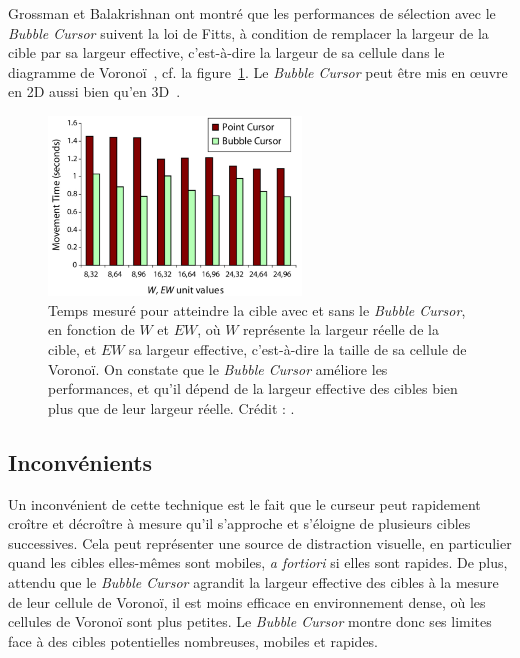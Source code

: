 	Grossman et Balakrishnan ont montré que les performances de sélection avec le \emph{Bubble Cursor} suivent la loi de Fitts, à condition de remplacer la largeur de la cible par sa largeur effective, c'est-à-dire la largeur de sa cellule dans le diagramme de Voronoï~\cite{grossman2005bubble}, cf. la figure~\ref{fig:bubbleResults}. Le \emph{Bubble Cursor} peut être mis en œuvre en 2D aussi bien qu'en 3D~\cite{vanacken2007exploring}.

	\begin{figure}[!htb]
		\centering
		\includegraphics[width=0.6\textwidth]{figures/ch2/bubbleResults}
		\caption[\emph{Bubble Cursor} --  performances]{Temps mesuré pour atteindre la cible avec et sans le \emph{Bubble Cursor}, en fonction de $W$ et $EW$, où $W$ représente la largeur réelle de la cible, et $EW$ sa largeur effective, c'est-à-dire la taille de sa cellule de Voronoï. On constate que le \emph{Bubble Cursor} améliore les performances, et qu'il dépend de la largeur effective des cibles bien plus que de leur largeur réelle. Crédit : \cite{grossman2005bubble}.}
		\label{fig:bubbleResults}
	\end{figure}

	\subsection{Inconvénients}
	Un inconvénient de cette technique est le fait que le curseur peut rapidement croître et décroître à mesure qu'il s'approche et s'éloigne de plusieurs cibles successives. Cela peut représenter une source de distraction visuelle, en particulier quand les cibles elles-mêmes sont mobiles, \emph{a fortiori} si elles sont rapides. De plus, attendu que le \emph{Bubble Cursor} agrandit la largeur effective des cibles à la mesure de leur cellule de Voronoï, il est moins efficace en environnement dense, où les cellules de Voronoï sont plus petites. Le \emph{Bubble Cursor} montre donc ses limites face à des cibles potentielles nombreuses, mobiles et rapides.
	
